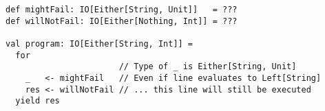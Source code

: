 \begin{algorithm}

\begin{verbatim}
def mightFail: IO[Either[String, Unit]]   = ???
def willNotFail: IO[Either[Nothing, Int]] = ???

val program: IO[Either[String, Int]] =
  for
                       // Type of _ is Either[String, Unit]
    _   <- mightFail   // Even if line evaluates to Left[String]
    res <- willNotFail // ... this line will still be executed
  yield res
\end{verbatim}

\caption{Subtle bugs not causing early termination or compilation error. %
\label{monadtransformer:subtle-bugs}}
\end{algorithm}